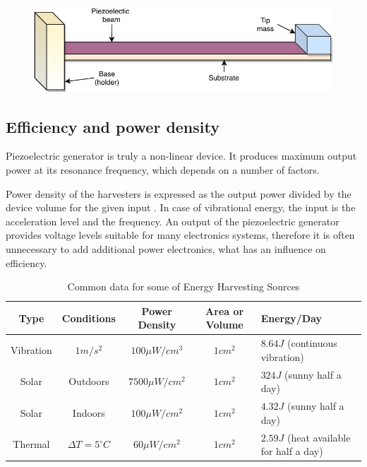 \documentclass[12pt,a4paper]{article}
\begin{document}
\begin{figure}[ht!]
\includegraphics[scale=1]{beam1.pdf}
\end{figure}

\subsection{Efficiency and power density}
Piezoelectric generator is truly a non-linear device. It produces maximum output power at its resonance frequency, which depends on a number of factors. 
\par
Power density of the harvesters is expressed as the output power divided by the device volume for the given input \cite{EnHv2}. In case of vibrational energy, the input is the acceleration level and the frequency. An output of the piezoelectric generator provides voltage levels suitable for many electronics systems, therefore it is often unnecessary to add additional power electronics, what has an influence on efficiency.
\par
\begin{table}[ht!]
\small
\begin{center} 
\begin{tabular}{|c|c|c|c|l|}
\hline 
\textbf{Type} & \textbf{Conditions} & \textbf{Power Density} & \textbf{Area or Volume} & \textbf{Energy/Day} \\ 
\hline 
\hline
Vibration & $1m/s^2$ & $100\mu W/cm^3$ & $1cm^2$ & $8.64J$ (continuous vibration) \\ 
\hline 
Solar & Outdoors & $7500\mu W/cm^2$ & $1cm^2$ & $324J$ (sunny half a day) \\ 
\hline 
Solar & Indoors & $100\mu W/cm^2$ & $1cm^2$ & $4.32J$ (sunny half a day) \\ 
\hline 
Thermal & $\Delta T = 5 ^{\circ} C$ & $60\mu W/cm^2$ & $1cm^2$ & $2.59J$ (heat available for half a day) \\ 
\hline 
\end{tabular} 
\end{center}
\caption{Common data for some of Energy Harvesting Sources \cite{EnHv1}}
\label{tab:typdat}
\end{table}
\par
\end{document}
